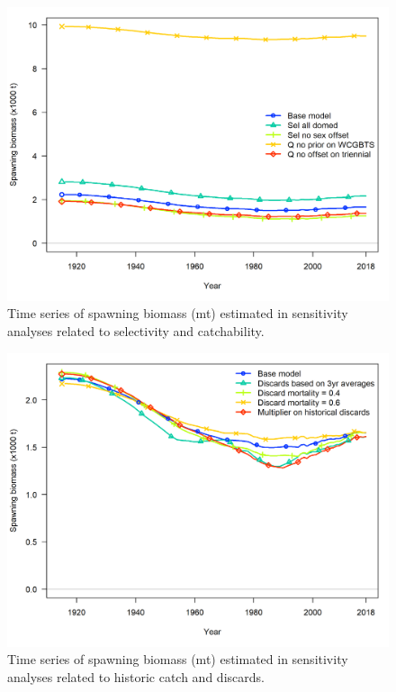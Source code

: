 \documentclass[12pt,]{article}
\begin{document}
\begin{figure}[h]
\begin{centering}
\includegraphics{Figures/sens.sel_and_Q_compare1_spawnbio.png}
\caption{Time series of spawning biomass (mt) estimated in sensitivity analyses related to selectivity and catchability.}\label{fig:Sensitivity_sel_and_Q}
\end{centering}
\end{figure}

\newpage

\begin{figure}
\centering
\includegraphics{Figures/sens.catch_compare1_spawnbio.png}
\caption{Time series of spawning biomass (mt) estimated in sensitivity
analyses related to historic catch and discards.
\label{fig:Sensitivity_catch}}
\end{figure}
\end{document}
